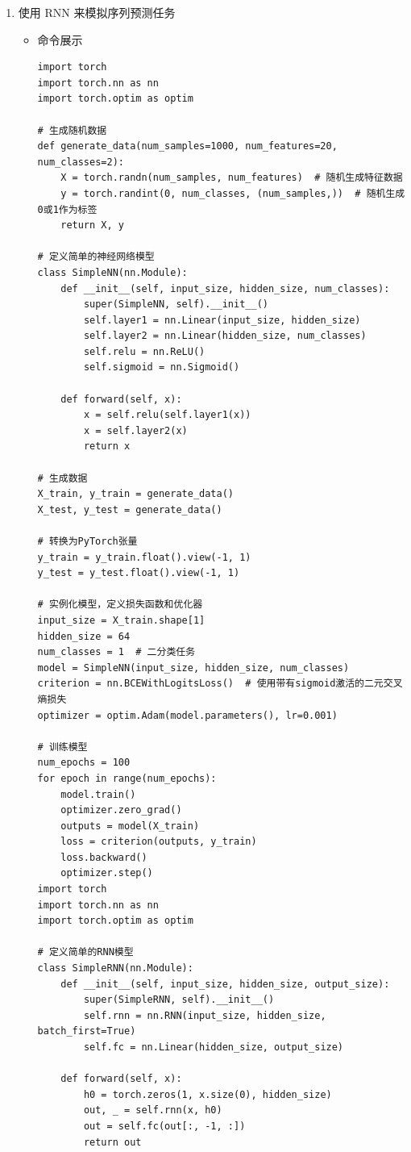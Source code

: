\documentclass[UTF8]{ctexart}
\begin{document}
\begin{enumerate}
  \item 使用 RNN 来模拟序列预测任务
  \begin{itemize}
  \item 命令展示
  \begin{verbatim}
import torch
import torch.nn as nn
import torch.optim as optim

# 生成随机数据
def generate_data(num_samples=1000, num_features=20, num_classes=2):
    X = torch.randn(num_samples, num_features)  # 随机生成特征数据
    y = torch.randint(0, num_classes, (num_samples,))  # 随机生成0或1作为标签
    return X, y

# 定义简单的神经网络模型
class SimpleNN(nn.Module):
    def __init__(self, input_size, hidden_size, num_classes):
        super(SimpleNN, self).__init__()
        self.layer1 = nn.Linear(input_size, hidden_size)
        self.layer2 = nn.Linear(hidden_size, num_classes)
        self.relu = nn.ReLU()
        self.sigmoid = nn.Sigmoid()

    def forward(self, x):
        x = self.relu(self.layer1(x))
        x = self.layer2(x)
        return x

# 生成数据
X_train, y_train = generate_data()
X_test, y_test = generate_data()

# 转换为PyTorch张量
y_train = y_train.float().view(-1, 1)
y_test = y_test.float().view(-1, 1)

# 实例化模型，定义损失函数和优化器
input_size = X_train.shape[1]
hidden_size = 64
num_classes = 1  # 二分类任务
model = SimpleNN(input_size, hidden_size, num_classes)
criterion = nn.BCEWithLogitsLoss()  # 使用带有sigmoid激活的二元交叉熵损失
optimizer = optim.Adam(model.parameters(), lr=0.001)

# 训练模型
num_epochs = 100
for epoch in range(num_epochs):
    model.train()
    optimizer.zero_grad()
    outputs = model(X_train)
    loss = criterion(outputs, y_train)
    loss.backward()
    optimizer.step()
import torch
import torch.nn as nn
import torch.optim as optim

# 定义简单的RNN模型
class SimpleRNN(nn.Module):
    def __init__(self, input_size, hidden_size, output_size):
        super(SimpleRNN, self).__init__()
        self.rnn = nn.RNN(input_size, hidden_size, batch_first=True)
        self.fc = nn.Linear(hidden_size, output_size)

    def forward(self, x):
        h0 = torch.zeros(1, x.size(0), hidden_size)
        out, _ = self.rnn(x, h0)
        out = self.fc(out[:, -1, :])
        return out


\end{verbatim}
\end{itemize}
\end{enumerate}
\end{document}
